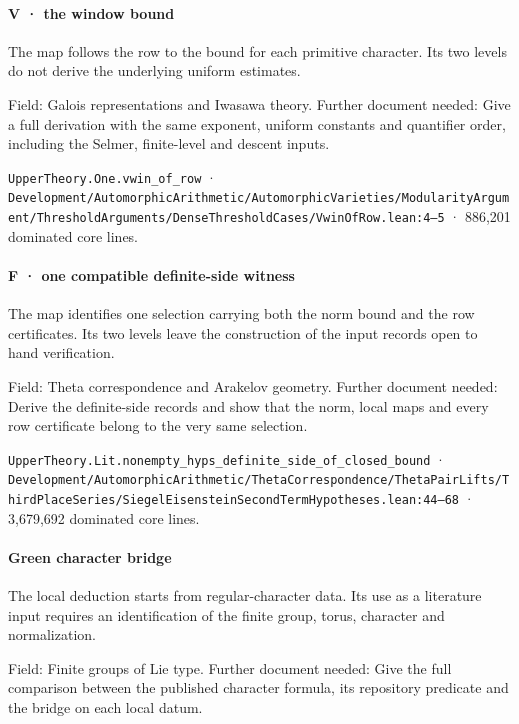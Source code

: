 \paragraph{V · the window bound}

The map follows the row to the bound for each primitive character. Its two levels do not derive the underlying uniform estimates.

Field: Galois representations and Iwasawa theory. Further document needed: Give a full derivation with the same exponent, uniform constants and quantifier order, including the Selmer, finite-level and descent inputs.

\nolinkurl{UpperTheory.One.vwin_of_row} · \nolinkurl{Development/AutomorphicArithmetic/AutomorphicVarieties/ModularityArgument/ThresholdArguments/DenseThresholdCases/VwinOfRow.lean:4–5} · 886,201 dominated core lines.

\paragraph{F · one compatible definite-side witness}

The map identifies one selection carrying both the norm bound and the row certificates. Its two levels leave the construction of the input records open to hand verification.

Field: Theta correspondence and Arakelov geometry. Further document needed: Derive the definite-side records and show that the norm, local maps and every row certificate belong to the very same selection.

\nolinkurl{UpperTheory.Lit.nonempty_hyps_definite_side_of_closed_bound} · \nolinkurl{Development/AutomorphicArithmetic/ThetaCorrespondence/ThetaPairLifts/ThirdPlaceSeries/SiegelEisensteinSecondTermHypotheses.lean:44–68} · 3,679,692 dominated core lines.

\paragraph{Green character bridge}

The local deduction starts from regular-character data. Its use as a literature input requires an identification of the finite group, torus, character and normalization.

Field: Finite groups of Lie type. Further document needed: Give the full comparison between the published character formula, its repository predicate and the bridge on each local datum.

